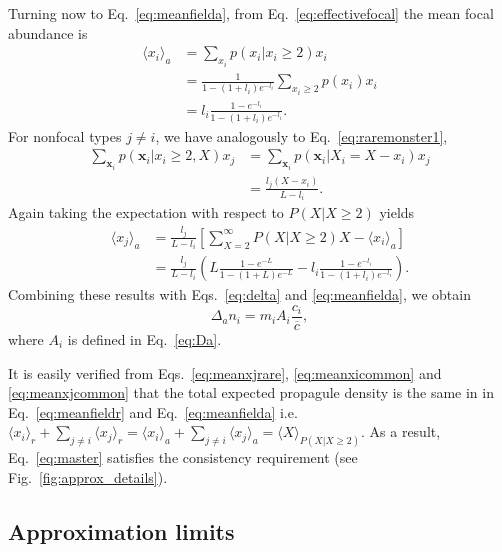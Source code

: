 \documentclass[12pt]{article}
\begin{document}
Turning now to Eq.~\eqref{eq:meanfielda}, from Eq.~\eqref{eq:effectivefocal} the mean focal abundance is 
\begin{align}
\langle x_i \rangle_{a}&=\sum_{x_i} p(x_i|x_i\geq 2)x_i \nonumber\\
&=\frac{1}{1-(1+l_i)e^{-l_i}}\sum_{x_i\geq 2} p(x_i)x_i\nonumber\\
&=l_i\frac{1-e^{-l_i}}{1-(1+l_i)e^{-l_i}}. \label{eq:meanxicommon}
\end{align}
For nonfocal types $j\neq i$, we have analogously to Eq.~\eqref{eq:raremonster1},
\begin{align}
\sum_{\mathbf x_i}  p(\mathbf x_i|x_i\geq 2,X) x_j&= \sum_{\mathbf x_i}  p(\mathbf x_i|X_i=X-x_i) x_j\nonumber\\
&= \frac{l_j(X-x_i)}{L-l_i}.
\end{align}
Again taking the expectation with respect to $P(X|X\geq 2)$ yields 
\begin{align}
\langle x_j \rangle_a&=\frac{l_j}{L-l_i}\left[\sum_{X=2}^{\infty}P(X|X\geq 2)X - \langle x_i \rangle_a \right]\nonumber\\
&=\frac{l_j}{L-l_i}\left( L\frac{1-e^{-L}}{1-(1+L)e^{-L}}- l_i\frac{1-e^{-l_i}}{1-(1+l_i)e^{-l_i}}\right). \label{eq:meanxjcommon}
\end{align}
Combining these results with Eqs.~\eqref{eq:delta} and \eqref{eq:meanfielda}, we obtain
\begin{equation}
\Delta_a n_i=m_i A_i \frac{c_i}{\overline{c}},
\end{equation}
where $A_i$ is defined in Eq.~\eqref{eq:Da}.

It is easily verified from Eqs.~\eqref{eq:meanxjrare}, \eqref{eq:meanxicommon} and \eqref{eq:meanxjcommon} that the total expected propagule density is the same in in Eq.~\eqref{eq:meanfieldr} and Eq.~\eqref{eq:meanfielda} i.e.~$\langle x_i \rangle_r + \sum_{j\neq i} \langle x_j \rangle_r=\langle x_i \rangle_a + \sum_{j\neq i} \langle x_j \rangle_a=\langle X \rangle_{P(X|X\geq 2)}$. As a result, Eq.~\eqref{eq:master} satisfies the consistency requirement (see Fig.~\ref{fig:approx_details}).

\subsection*{Approximation limits}
\end{document}
